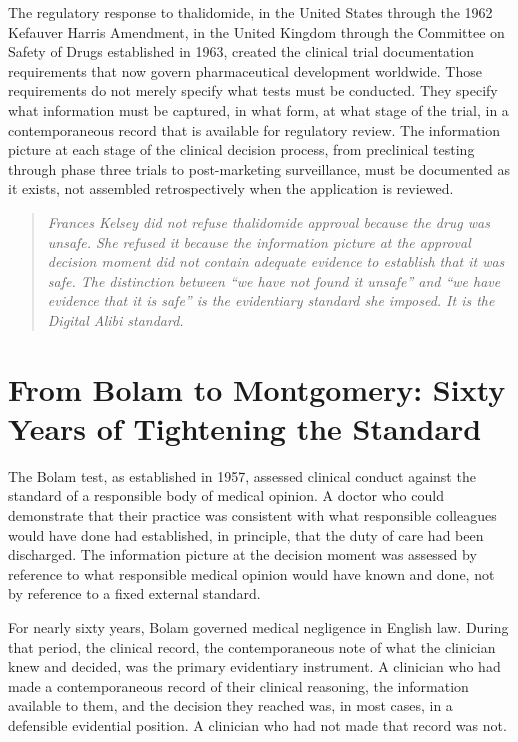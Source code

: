 The regulatory response to thalidomide, in the United States through the 1962 Kefauver Harris Amendment, in the United Kingdom through the Committee on Safety of Drugs established in 1963, created the clinical trial documentation requirements that now govern pharmaceutical development worldwide. Those requirements do not merely specify what tests must be conducted. They specify what information must be captured, in what form, at what stage of the trial, in a contemporaneous record that is available for regulatory review. The information picture at each stage of the clinical decision process, from preclinical testing through phase three trials to post-marketing surveillance, must be documented as it exists, not assembled retrospectively when the application is reviewed.

\begin{quote}
\emph{Frances Kelsey did not refuse thalidomide approval because the drug was unsafe. She refused it because the information picture at the approval decision moment did not contain adequate evidence to establish that it was safe. The distinction between ``we have not found it unsafe'' and ``we have evidence that it is safe'' is the evidentiary standard she imposed. It is the Digital Alibi standard.}
\end{quote}

\scenebreak

\section{From Bolam to Montgomery: Sixty Years of Tightening the Standard}

The Bolam test, as established in 1957, assessed clinical conduct against the standard of a responsible body of medical opinion. A doctor who could demonstrate that their practice was consistent with what responsible colleagues would have done had established, in principle, that the duty of care had been discharged. The information picture at the decision moment was assessed by reference to what responsible medical opinion would have known and done, not by reference to a fixed external standard.

For nearly sixty years, Bolam governed medical negligence in English law. During that period, the clinical record, the contemporaneous note of what the clinician knew and decided, was the primary evidentiary instrument. A clinician who had made a contemporaneous record of their clinical reasoning, the information available to them, and the decision they reached was, in most cases, in a defensible evidential position. A clinician who had not made that record was not.

